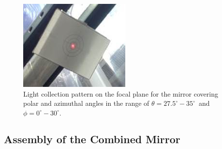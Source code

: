 %

\begin{figure}[ht]
    \centering
    \includegraphics[width=0.95\linewidth]{images/Focal_Plane_1R.jpg}
    \caption{Light collection pattern on the focal plane for the mirror covering polar and azimuthal angles in the range
      of $\theta = 27.5^\circ - 35^\circ$\, and\, $\phi = 0^\circ - 30^\circ$.}
    \label{fig:Focal_Plane_1R}
\end{figure}

\subsection{Assembly of the Combined Mirror}

